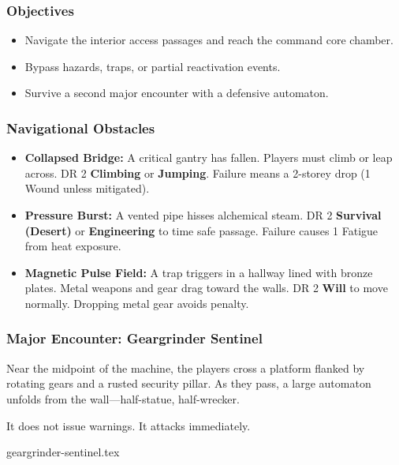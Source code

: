\subsubsection*{Objectives}
\begin{itemize}
    \item Navigate the interior access passages and reach the command core chamber.
    \item Bypass hazards, traps, or partial reactivation events.
    \item Survive a second major encounter with a defensive automaton.
\end{itemize}





\subsubsection*{Navigational Obstacles}
\begin{itemize}
    \item \textbf{Collapsed Bridge:} A critical gantry has fallen. Players must climb or leap across. DR 2 \textbf{Climbing} or \textbf{Jumping}. Failure means a 2-storey drop (1 Wound unless mitigated).

    \item \textbf{Pressure Burst:} A vented pipe hisses alchemical steam. DR 2 \textbf{Survival (Desert)} or \textbf{Engineering} to time safe passage. Failure causes 1 Fatigue from heat exposure.

    \item \textbf{Magnetic Pulse Field:} A trap triggers in a hallway lined with bronze plates. Metal weapons and gear drag toward the walls. DR 2 \textbf{Will} to move normally. Dropping metal gear avoids penalty.
\end{itemize}

\subsubsection*{Major Encounter: Geargrinder Sentinel}

Near the midpoint of the machine, the players cross a platform flanked by rotating gears and a rusted security pillar. As they pass, a large automaton unfolds from the wall—half-statue, half-wrecker.

It does not issue warnings. It attacks immediately.

{geargrinder-sentinel.tex}


